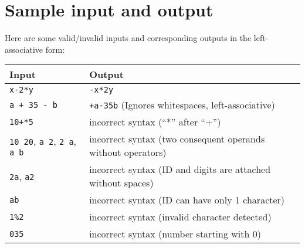 \documentclass[11pt]{article}
\begin{document}
\section{Sample input and output}
Here are some valid/invalid inputs and corresponding outputs in the left-associative form:
\begin{center}
	\begin{tabular}{|l|l|}
		\hline
		Input & Output \\ \hline
		\texttt{x-2*y} & \texttt{-x*2y} \\ \hline
		\texttt{a + 35 - b} & \texttt{+a-35b} (Ignores whitespaces, left-associative) \\ \hline
		\texttt{10+*5} & incorrect syntax (``*'' after ``+'') \\ \hline
		\texttt{10 20}, \texttt{a 2}, \texttt{2 a}, \texttt{a b} & incorrect syntax (two consequent operands without operators) \\ \hline
		\texttt{2a}, \texttt{a2} & incorrect syntax (ID and digits are attached without spaces) \\ \hline
		\texttt{ab} & incorrect syntax (ID can have only 1 character) \\ \hline
		\texttt{1\%2} & incorrect syntax (invalid character detected) \\ \hline
		\texttt{035} & incorrect syntax (number starting with 0) \\ \hline
	\end{tabular}
\end{center}





\end{document}
